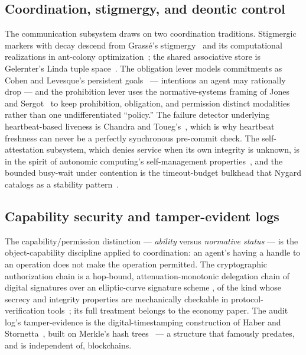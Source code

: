 \documentclass[11pt,a4paper]{article}
\theoremstyle{definition}
\theoremstyle{remark}
\begin{document}
\subsection{Coordination, stigmergy, and deontic control}

The communication subsystem draws on two coordination traditions. Stigmergic markers
with decay descend from Grass\'e's stigmergy~ and its
computational realizations in ant-colony optimization~; the shared
associative store is Gelernter's Linda tuple space~. The
obligation lever models commitments as Cohen and Levesque's persistent
goals~ --- intentions an agent may rationally drop --- and
the prohibition lever uses the normative-systems framing of Jones and
Sergot~ to keep prohibition, obligation, and permission
distinct modalities rather than one undifferentiated ``policy.'' The failure
detector underlying heartbeat-based liveness is Chandra and Toueg's~,
which is why heartbeat freshness can never be a perfectly synchronous pre-commit
check. The self-attestation subsystem, which denies service when its own integrity is
unknown, is in the spirit of autonomic computing's self-management
properties~, and the bounded busy-wait under contention is
the timeout-budget bulkhead that Nygard catalogs as a stability
pattern~.

\subsection{Capability security and tamper-evident logs}

The capability/permission distinction --- \emph{ability} versus \emph{normative
status} --- is the object-capability discipline applied to coordination: an agent's
having a handle to an operation does not make the operation permitted. The
cryptographic authorization chain is a hop-bound, attenuation-monotonic delegation
chain of digital signatures over an elliptic-curve signature scheme
, of the kind whose secrecy and integrity properties are
mechanically checkable in protocol-verification tools~;
its full treatment belongs to the economy paper. The audit log's tamper-evidence is
the digital-timestamping construction of Haber and
Stornetta~, built on Merkle's hash trees~
--- a structure that famously predates, and is independent of, blockchains.
\end{document}
